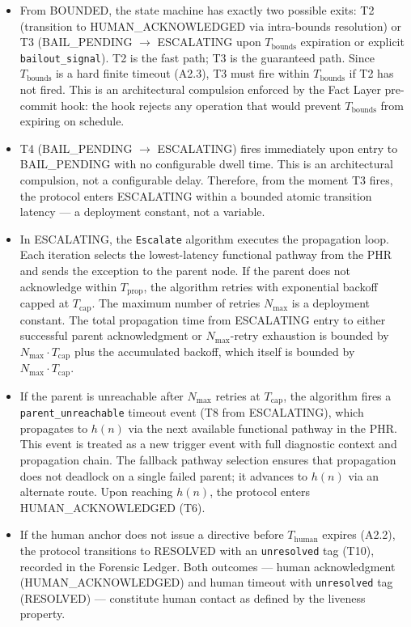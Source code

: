 \begin{itemize}
\item[\textbf{Step 1.}] From BOUNDED, the state machine has exactly two possible exits: T2 (transition to HUMAN\_ACKNOWLEDGED via intra-bounds resolution) or T3 (BAIL\_PENDING $\rightarrow$ ESCALATING upon $T_{\text{bounds}}$ expiration or explicit \texttt{bailout\_signal}). T2 is the fast path; T3 is the guaranteed path. Since $T_{\text{bounds}}$ is a hard finite timeout (A2.3), T3 must fire within $T_{\text{bounds}}$ if T2 has not fired. This is an architectural compulsion enforced by the Fact Layer pre-commit hook: the hook rejects any operation that would prevent $T_{\text{bounds}}$ from expiring on schedule.

\item[\textbf{Step 2.}] T4 (BAIL\_PENDING $\rightarrow$ ESCALATING) fires immediately upon entry to BAIL\_PENDING with no configurable dwell time. This is an architectural compulsion, not a configurable delay. Therefore, from the moment T3 fires, the protocol enters ESCALATING within a bounded atomic transition latency --- a deployment constant, not a variable.

\item[\textbf{Step 3.}] In ESCALATING, the \texttt{Escalate} algorithm executes the propagation loop. Each iteration selects the lowest-latency functional pathway from the PHR and sends the exception to the parent node. If the parent does not acknowledge within $T_{\text{prop}}$, the algorithm retries with exponential backoff capped at $T_{\text{cap}}$. The maximum number of retries $N_{\max}$ is a deployment constant. The total propagation time from ESCALATING entry to either successful parent acknowledgment or $N_{\max}$-retry exhaustion is bounded by $N_{\max} \cdot T_{\text{cap}}$ plus the accumulated backoff, which itself is bounded by $N_{\max} \cdot T_{\text{cap}}$.

\item[\textbf{Step 4.}] If the parent is unreachable after $N_{\max}$ retries at $T_{\text{cap}}$, the algorithm fires a \texttt{parent\_unreachable} timeout event (T8 from ESCALATING), which propagates to $h(n)$ via the next available functional pathway in the PHR. This event is treated as a new trigger event with full diagnostic context and propagation chain. The fallback pathway selection ensures that propagation does not deadlock on a single failed parent; it advances to $h(n)$ via an alternate route. Upon reaching $h(n)$, the protocol enters HUMAN\_ACKNOWLEDGED (T6).

\item[\textbf{Step 5.}] If the human anchor does not issue a directive before $T_{\text{human}}$ expires (A2.2), the protocol transitions to RESOLVED with an \texttt{unresolved} tag (T10), recorded in the Forensic Ledger. Both outcomes --- human acknowledgment (HUMAN\_ACKNOWLEDGED) and human timeout with \texttt{unresolved} tag (RESOLVED) --- constitute human contact as defined by the liveness property.
\end{itemize}

